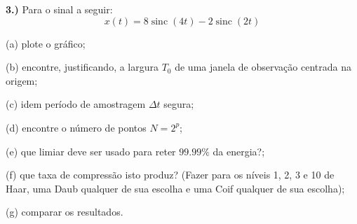 \documentclass[10pt]{article}
\DeclareMathOperator{\sinc}{sinc}
\begin{document}
\vspace{\baselineskip}


\textbf{3.)} Para o sinal a seguir:
\[x(t) = 8\sinc(4t) - 2\sinc(2t)\]

(a) plote o gráfico;

(b) encontre, justificando, a largura $T_0$ de uma janela de observação centrada na origem;

(c) idem período de amostragem $\Delta t$ segura;

(d) encontre o número de pontos $N = 2^p$;

(e) que limiar deve ser usado para reter $99.99\%$ da energia?;

(f) que taxa de compressão isto produz? (Fazer para os níveis 1, 2, 3 e 10 de Haar, uma Daub qualquer de sua escolha e uma Coif qualquer de sua escolha);

(g) comparar os resultados.
\end{document}
